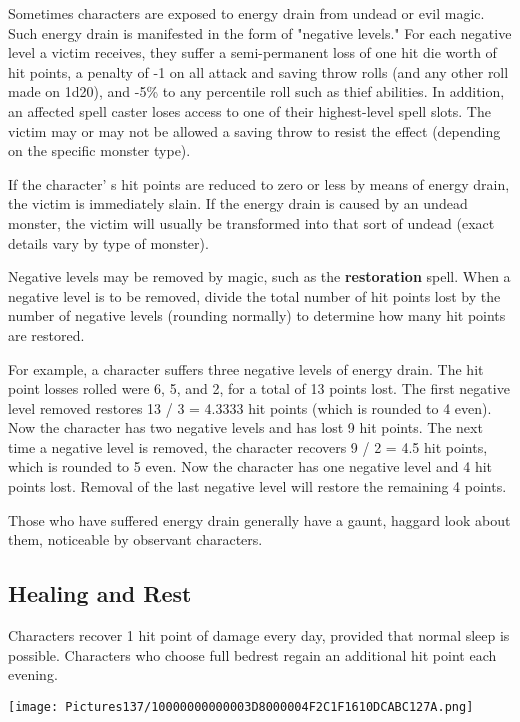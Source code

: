 \documentclass[a4paper,twoside,openany,10pt]{book}
\begin{document}
\begin{multicols}{2}
Sometimes characters are exposed to energy drain from undead or evil magic. Such energy drain is manifested in the form of "negative levels." For each negative level a victim receives, they suffer a semi-permanent loss of one hit die worth of hit points, a penalty of -1 on all attack and saving throw rolls (and any other roll made on 1d20), and -5\% to any percentile roll such as thief abilities. In addition, an affected spell caster loses access to one of their highest-level spell slots. The victim may or may not be allowed a saving throw to resist the effect (depending on the specific monster type).

If the character' s hit points are reduced to zero or less by means of energy drain, the victim is immediately slain. If the energy drain is caused by an undead monster, the victim will usually be transformed into that sort of undead (exact details vary by type of monster).

Negative levels may be removed by magic, such as the \textbf{restoration} spell. When a negative level is to be removed, divide the total number of hit points lost by the number of negative levels (rounding normally) to determine how many hit points are restored.

For example, a character suffers three negative levels of energy drain. The hit point losses rolled were 6, 5, and 2, for a total of 13 points lost. The first negative level removed restores 13 / 3 = 4.3333 hit points (which is rounded to 4 even). Now the character has two negative levels and has lost 9 hit points. The next time a negative level is removed, the character recovers 9 / 2 = 4.5 hit points, which is rounded to 5 even. Now the character has one negative level and 4 hit points lost. Removal of the last negative level will restore the remaining 4 points.

Those who have suffered energy drain generally have a gaunt, haggard look about them, noticeable by observant characters.

\subsection{Healing and Rest}\label{healing-and-rest}

Characters recover 1 hit point of damage every day, provided that normal sleep is possible. Characters who choose full bedrest regain an additional hit point each evening.

\begin{flushleft}
	\texttt{[image: Pictures137/10000000000003D8000004F2C1F1610DCABC127A.png]}
\end{flushleft}



\end{multicols}
\end{document}
